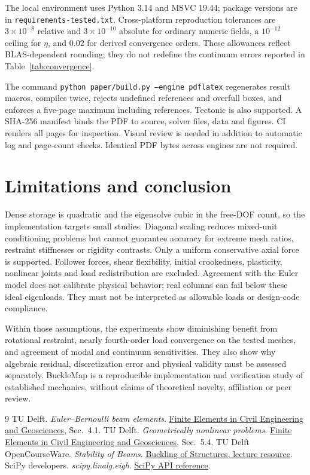 \documentclass[10pt,a4paper]{article}
\begin{document}
The local environment uses Python 3.14 and MSVC 19.44; package versions are in
\texttt{requirements-tested.txt}. Cross-platform reproduction tolerances are
$3\times10^{-8}$ relative and $3\times10^{-10}$ absolute for ordinary numeric
fields, a $10^{-12}$ ceiling for $\eta$, and $0.02$ for derived convergence
orders. These allowances reflect BLAS-dependent rounding; they do not redefine
the continuum errors reported in Table~\ref{tab:convergence}.

The command \texttt{python paper/build.py --engine pdflatex} regenerates result
macros, compiles twice, rejects undefined references and overfull boxes, and
enforces a five-page maximum including references. Tectonic is also supported.
A SHA-256 manifest binds the PDF to source, solver files, data and figures.
CI renders all pages for inspection. Visual review is needed in addition to
automatic log and page-count checks. Identical PDF bytes across engines are
not required.

\section{Limitations and conclusion}
Dense storage is quadratic and the eigensolve cubic in the free-DOF count, so
the implementation targets small studies. Diagonal scaling reduces mixed-unit
conditioning problems but cannot guarantee accuracy for extreme mesh ratios,
restraint stiffnesses or rigidity contrasts. Only a uniform conservative
axial force is supported. Follower forces, shear flexibility, initial
crookedness, plasticity, nonlinear joints and load redistribution are excluded.
Agreement with the Euler model does not calibrate physical behavior; real
columns can fail below these ideal eigenloads. They must not be interpreted
as allowable loads or design-code compliance.

Within those assumptions, the experiments show diminishing benefit from
rotational restraint, nearly fourth-order load convergence on the tested
meshes, and agreement of modal and continuum sensitivities. They also show
why algebraic residual, discretization error and physical validity must be
assessed separately. BuckleMap is a reproducible implementation and
verification study of established mechanics, without claims of theoretical
novelty, affiliation or peer review.

\begin{thebibliography}{9}\small
{} TU Delft. \emph{Euler--Bernoulli beam elements}.
\href{https://teachbooks.tudelft.nl/computational-modelling/structural_linear/euler_bernouilli.html}{Finite Elements in Civil Engineering and Geosciences}, Sec.~4.1.
 TU Delft. \emph{Geometrically nonlinear problems}.
\href{https://teachbooks.tudelft.nl/computational-modelling/solid_nonlinear/geometric_nonlinearity.html}{Finite Elements in Civil Engineering and Geosciences}, Sec.~5.4.
 TU Delft OpenCourseWare. \emph{Stability of Beams}.
\href{https://ocw.tudelft.nl/course-lectures/stability-of-beams/}{Buckling of Structures, lecture resource}.
 SciPy developers. \emph{scipy.linalg.eigh}.
\href{https://docs.scipy.org/doc/scipy/reference/generated/scipy.linalg.eigh.html}{SciPy API reference}.
\end{thebibliography}
\end{document}
